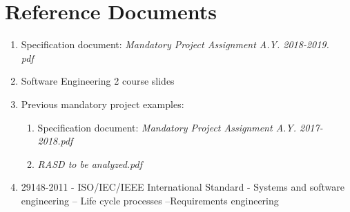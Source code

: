 \section{Reference Documents}
    \begin{enumerate}
        \item Specification document: \textit{Mandatory Project Assignment A.Y. 2018-2019.\\pdf}
        
        \item Software Engineering 2 course slides
        
        \item Previous mandatory project examples: 
            \begin{enumerate}
                \item Specification document: \textit{Mandatory Project Assignment A.Y. 2017-2018.pdf}
                
                \item \textit{RASD to be analyzed.pdf}
            \end{enumerate}
            
        \item 29148-2011 - ISO/IEC/IEEE International Standard - Systems and software engineering -- Life cycle processes --Requirements engineering
    \end{enumerate}